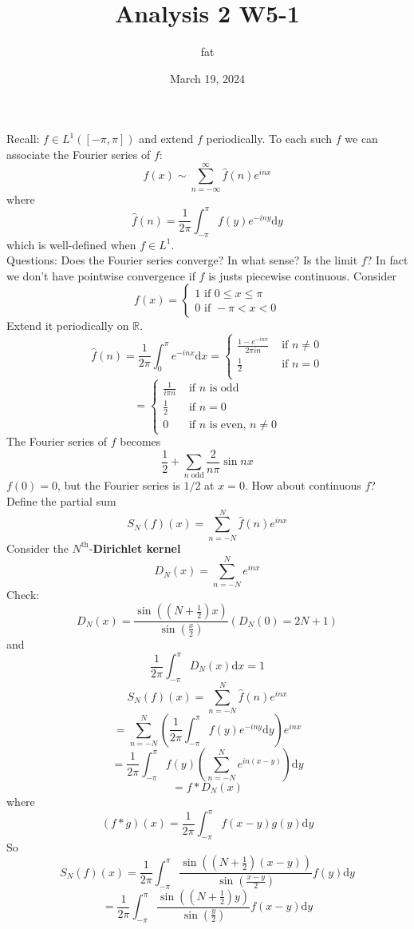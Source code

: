 \documentclass{article}
\title{Analysis 2 W5-1}
\author{fat}
\date{March 19, 2024}
\theoremstyle{definition}
\begin{document}
\maketitle
\thispagestyle{fancy}
\renewcommand{\footrulewidth}{0.4pt}
\cfoot{\thepage}
\renewcommand{\headrulewidth}{0.4pt}

Recall:
$f \in L^1([-\pi, \pi])$ and extend $f$ periodically.
To each such $f$ we can associate the Fourier series of $f$:
\[
	f(x) \sim \sum_{n = - \infty}^\infty \hat{f}(n) e^{inx}
\]
where 
\[
	\hat{f}(n) = \frac{1}{2 \pi} \int_{-\pi}^\pi f(y) e^{-iny} \mathrm{d} y
\]
which is well-defined when $f \in L^1$.\\
Questions: Does the Fourier series converge? 
In what sense?
Is the limit $f$?
In fact we don't have pointwise convergence if $f$ is justs piecewise continuous.
Consider 
\[
	f(x) = 
	\begin{cases}
		1 \text{ if } 0 \leq x \leq \pi\\
		0 \text{ if } - \pi < x < 0
	\end{cases}
\]
Extend it periodically on $\mathbb{R}$.
\[
	\hat{f}(n) = \frac{1}{2 \pi} \int_0^\pi e^{-inx} \mathrm{d} x = 
	\begin{cases}
		\frac{1 - e^{-in \pi}}{2 \pi i n} & \text{ if } n \neq 0\\
		\frac{1}{2} & \text{ if } n = 0\\
	\end{cases}
\]
\[
	= 
	\begin{cases}
		\frac{1}{i \pi n} & \text{ if } n \text{ is odd}\\
		\frac{1}{2} & \text{ if } n = 0\\
		0 & \text{ if } n \text{ is even, } n \neq 0
	\end{cases}
\]
The Fourier series of $f$ becomes
\[
	\frac{1}{2} + \sum_{n \text{ odd}} \frac{2}{n \pi} \sin nx
\]
$f(0) = 0$, but the Fourier series is $1/2$ at $x = 0$.
How about continuous $f$?
Define the partial sum
\[
	S_N(f)(x) = \sum_{n = -N}^N \hat{f}(n) e^{inx}
\]
Consider the $N^{\text{th}}$-\textbf{Dirichlet kernel}
\[
	D_N(x) = \sum_{n = -N}^N e^{inx}
\]
Check:
\[
	D_N(x) = \frac{\sin \left(\left(N + \frac{1}{2} \right) x \right)}{\sin \left( \frac{x}{2} \right)}  (D_N(0) = 2N + 1)
\]
and
\[
	\frac{1}{2 \pi} \int_{-\pi}^\pi D_N(x) \mathrm{d} x = 1
\]
\[
	S_N(f)(x) = \sum_{n = -N}^N \hat{f}(n) e^{inx}
\]
\[
	= \sum_{n = -N}^N \left( \frac{1}{2 \pi} \int_{-\pi}^\pi f(y) e^{-iny} \mathrm{d} y \right) e^{inx}
\]
\[
	= \frac{1}{2 \pi} \int_{- \pi}^\pi f(y) \left( \sum_{n = -N}^N e^{in (x - y)} \right) \mathrm{d} y
\]
\[
	= f * D_N(x)
\]
where 
\[
	(f*g)(x) = \frac{1}{2 \pi} \int_{- \pi}^\pi f(x - y) g(y) \mathrm{d}y
\]
So
\[
	S_N(f)(x) = \frac{1}{2 \pi} \int_{- \pi}^\pi \frac{\sin \left( \left(N + \frac{1}{2} \right) \left( x - y \right) \right)}{\sin \left(\frac{x - y}{2} \right)} f(y) \mathrm{d} y
\]
\[
	= \frac{1}{2 \pi} \int_{- \pi}^\pi \frac{\sin \left( \left( N + \frac{1}{2} \right) y \right)}{\sin \left( \frac{y}{2} \right)} f(x - y) \mathrm{d} y
\]
\end{document}
